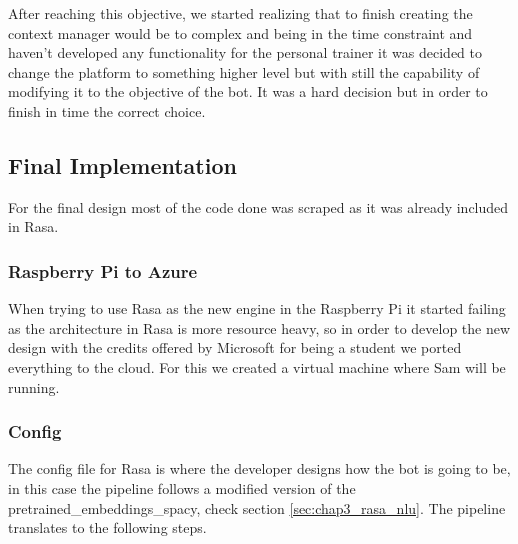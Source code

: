 After reaching this objective, we started realizing that to finish creating the context manager would be to complex and being in the time constraint and haven’t developed any functionality for the personal trainer it was decided to change the platform to something higher level but with still the capability of modifying it to the objective of the bot. It was a hard decision but in order to finish in time the correct choice.

\subsection{Final Implementation}\label{sec:chap4_fin_imp}

For the final design most of the code done was scraped as it was already included in Rasa.

\subsubsection{Raspberry Pi to Azure}\label{sec:chap4_fin_rasp_azur}

When trying to use Rasa as the new engine in the Raspberry Pi it started failing as the architecture in Rasa is more resource heavy, so in order to develop the new design with the credits offered by Microsoft for being a student we ported everything to the cloud. For this we created a virtual machine where Sam will be running.

\subsubsection{Config}\label{sec:chap4_fin_conf}

The config file for Rasa is where the developer designs how the bot is going to be, in this case the pipeline follows a modified version of the pretrained\_embeddings\_spacy, check section \ref{sec:chap3_rasa_nlu}. The pipeline translates to the following steps.

